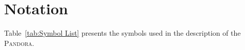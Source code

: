 \documentclass[lettersize,journal]{IEEEtran}
\newcommand{\pandora}{{\scshape Pandora}\xspace}
\begin{document}
\section*{Notation}
\label{Sec:Notation}
Table~\ref{tab:Symbol List} presents the symbols used in the description of the \pandora.

\end{document}
